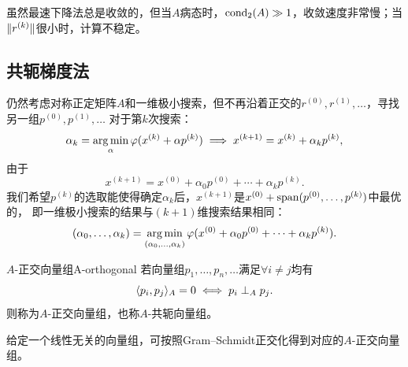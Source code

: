 \begin{remark}
    虽然最速下降法总是收敛的，但当$A$病态时，$\operatorname{cond}_2(A) \gg 1$，收敛速度非常慢；当$\lVert r^{(k)}\rVert$很小时，计算不稳定。
\end{remark}

\subsection{共轭梯度法}
\label{ssec:conjugate gradient method}

仍然考虑对称正定矩阵$A$和一维极小搜索，但不再沿着正交的$r^{(0)},r^{(1)},\ldots$，寻找另一组$p^{(0)},p^{(1)},\ldots$
对于第$k$次搜索：
\begin{equation}\label{eq:na-conjugate-direction-line-search}
    \alpha_k = \operatorname*{arg\,min}_\alpha\varphi(x^{(k)} + \alpha p^{(k)}) \implies
    x^{(k+1)} = x^{(k)} + \alpha_kp^{(k)},
\end{equation}
由于
\[
    x^{(k+1)} = x^{(0)} + \alpha_0p^{(0)} + \cdots + \alpha_kp^{(k)}.
\]
我们希望$p^{(k)}$的选取能使得确定$\alpha_k$后，$x^{(k+1)}$是$x^{(0)} + \operatorname{span}(p^{(0)},\ldots,p^{(k)})$中最优的，
即一维极小搜索的结果与$(k + 1)$维搜索结果相同：
\[
    (\alpha_0,\ldots,\alpha_k) = \operatorname*{arg\,min}_{(\alpha_0,\ldots,\alpha_k)}\varphi(x^{(0)} + \alpha_0p^{(0)} + \cdots + \alpha_kp^{(k)}).
\]

\begin{definition}
    {$A$-正交向量组}{A-orthogonal}
    若向量组$p_1,\ldots,p_n,\ldots$满足$\forall i \neq j$均有
    \begin{equation}
        \langle p_i,p_j\rangle_A = 0 \iff p_i \perp_A p_j.
    \end{equation}
    则称为$A$-正交向量组，也称$A$-共轭向量组。
\end{definition}

\begin{corollary}
    给定一个线性无关的向量组，可按照Gram--Schmidt正交化得到对应的$A$-正交向量组。
\end{corollary}

